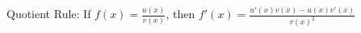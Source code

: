\documentclass[preview]{standalone}
\begin{document}
\begin{center}
Quotient Rule: If $f(x) = \frac{u(x)}{v(x)}$, then $f'(x) = \frac{u'(x)v(x) - u(x)v'(x)}{v(x)^2}$
\end{center}
\end{document}
